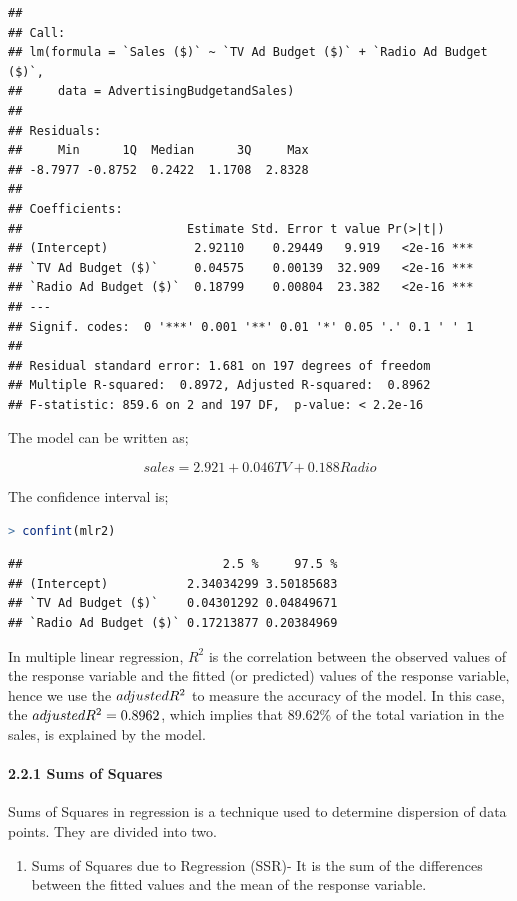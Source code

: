 \documentclass[
]{article}
\providecommand{\tightlist}{%
  \setlength{\itemsep}{0pt}\setlength{\parskip}{0pt}}
\begin{document}
\begin{lstlisting}
## 
## Call:
## lm(formula = `Sales ($)` ~ `TV Ad Budget ($)` + `Radio Ad Budget ($)`, 
##     data = AdvertisingBudgetandSales)
## 
## Residuals:
##     Min      1Q  Median      3Q     Max 
## -8.7977 -0.8752  0.2422  1.1708  2.8328 
## 
## Coefficients:
##                       Estimate Std. Error t value Pr(>|t|)    
## (Intercept)            2.92110    0.29449   9.919   <2e-16 ***
## `TV Ad Budget ($)`     0.04575    0.00139  32.909   <2e-16 ***
## `Radio Ad Budget ($)`  0.18799    0.00804  23.382   <2e-16 ***
## ---
## Signif. codes:  0 '***' 0.001 '**' 0.01 '*' 0.05 '.' 0.1 ' ' 1
## 
## Residual standard error: 1.681 on 197 degrees of freedom
## Multiple R-squared:  0.8972, Adjusted R-squared:  0.8962 
## F-statistic: 859.6 on 2 and 197 DF,  p-value: < 2.2e-16
\end{lstlisting}

The model can be written as;

\[sales=2.921+0.046TV+0.188Radio\]

The confidence interval is;

\begin{lstlisting}[language=R]
> confint(mlr2)
\end{lstlisting}

\begin{lstlisting}
##                            2.5 %     97.5 %
## (Intercept)           2.34034299 3.50185683
## `TV Ad Budget ($)`    0.04301292 0.04849671
## `Radio Ad Budget ($)` 0.17213877 0.20384969
\end{lstlisting}

In multiple linear regression, \(R^2\) is the correlation between the
observed values of the response variable and the fitted (or predicted)
values of the response variable, hence we use the \(adjusted\space R^2\)
to measure the accuracy of the model. In this case, the
\(adjusted\space R^2 =0.8962\), which implies that 89.62\% of the total
variation in the sales, is explained by the model.

\hypertarget{sums-of-squares}{%
\paragraph{2.2.1 Sums of Squares}\label{sums-of-squares}}

Sums of Squares in regression is a technique used to determine
dispersion of data points. They are divided into two.

\begin{enumerate}
\def\labelenumi{\arabic{enumi}.}
\tightlist
\item
  Sums of Squares due to Regression (SSR)- It is the sum of the
  differences between the fitted values and the mean of the response
  variable.
\end{enumerate}
\end{document}
